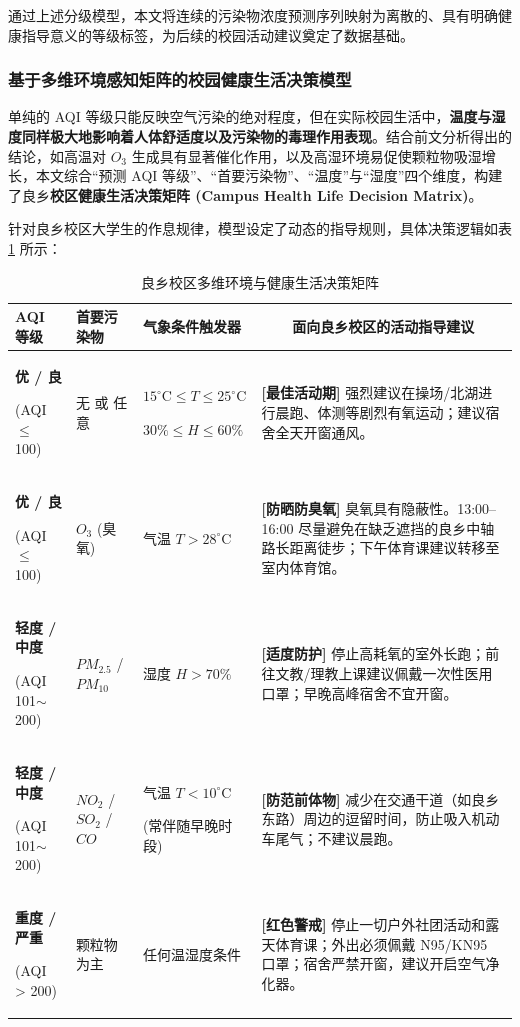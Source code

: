 \documentclass[a4paper, 12pt]{ctexart} %
\begin{document}
通过上述分级模型，本文将连续的污染物浓度预测序列映射为离散的、具有明确健康指导意义的等级标签，为后续的校园活动建议奠定了数据基础。

\subsubsection{基于多维环境感知矩阵的校园健康生活决策模型}

单纯的 AQI 等级只能反映空气污染的绝对程度，但在实际校园生活中，\textbf{温度与湿度同样极大地影响着人体舒适度以及污染物的毒理作用表现}。结合前文分析得出的结论，如高温对 $O_3$ 生成具有显著催化作用，以及高湿环境易促使颗粒物吸湿增长，本文综合“预测 AQI 等级”、“首要污染物”、“温度”与“湿度”四个维度，构建了良乡\textbf{校区健康生活决策矩阵 (Campus Health Life Decision Matrix)}。

针对良乡校区大学生的作息规律，模型设定了动态的指导规则，具体决策逻辑如表 \ref{tab:decision_matrix} 所示：

\begin{table}[h]
\centering
\renewcommand{\arraystretch}{1.5} 
\caption{良乡校区多维环境与健康生活决策矩阵}
\label{tab:decision_matrix}
\begin{tabular}{|>{\centering\arraybackslash}m{2.8cm}|>{\centering\arraybackslash}m{2.0cm}|>{\centering\arraybackslash}m{3.5cm}|m{5.6cm}|}
\hline
\textbf{AQI 等级} & \textbf{首要污染物} & \textbf{气象条件触发器} & \multicolumn{1}{c|}{\textbf{面向良乡校区的活动指导建议}} \\ \hline
\textbf{优 / 良} \par (AQI $\le$ 100) & 无 或 任意 & $15^\circ\text{C} \le T \le 25^\circ\text{C}$ \par $30\% \le H \le 60\%$ & \textbf{[最佳活动期]} 强烈建议在操场/北湖进行晨跑、体测等剧烈有氧运动；建议宿舍全天开窗通风。 \\ \hline
\textbf{优 / 良} \par (AQI $\le$ 100) & $O_3$ (臭氧) & 气温 $T > 28^\circ\text{C}$ & \textbf{[防晒防臭氧]} 臭氧具有隐蔽性。13:00--16:00 尽量避免在缺乏遮挡的良乡中轴路长距离徒步；下午体育课建议转移至室内体育馆。 \\ \hline
\textbf{轻度 / 中度} \par (AQI 101$\sim$200) & $PM_{2.5}$ / $PM_{10}$ & 湿度 $H > 70\%$ & \textbf{[适度防护]} 停止高耗氧的室外长跑；前往文教/理教上课建议佩戴一次性医用口罩；早晚高峰宿舍不宜开窗。 \\ \hline
\textbf{轻度 / 中度} \par (AQI 101$\sim$200) & $NO_2$ / $SO_2$ / $CO$ & 气温 $T < 10^\circ\text{C}$ \par (常伴随早晚时段) & \textbf{[防范前体物]} 减少在交通干道（如良乡东路）周边的逗留时间，防止吸入机动车尾气；不建议晨跑。 \\ \hline
\textbf{重度 / 严重} \par (AQI > 200) & 颗粒物为主 & 任何温湿度条件 & \textbf{[红色警戒]} 停止一切户外社团活动和露天体育课；外出必须佩戴 N95/KN95 口罩；宿舍严禁开窗，建议开启空气净化器。 \\ \hline
\end{tabular}
\end{table}
\end{document}
